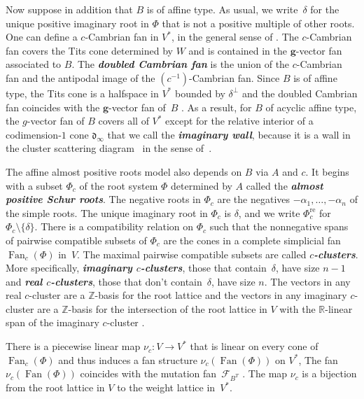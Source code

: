 \documentclass{amsart}
\theoremstyle{definition}
\theoremstyle{remark}
\numberwithin{equation}{section}
\newcommand{\newword}[1]{\textbf{\emph{#1}}}
\newcommand{\integers}{\mathbb Z}
\newcommand{\reals}{\mathbb R}
\newcommand{\set}[1]{{\lbrace #1 \rbrace}}
\newcommand{\F}{{\mathcal F}}
\newcommand{\0}{{\mathbf{0}}}
\newcommand{\g}{\mathbf{g}}
\newcommand{\Fan}{\operatorname{Fan}}
\newcommand{\re}{\mathrm{re}}
\renewcommand{\d}{{\mathfrak d}}
\newcommand{\RSChar}{\Phi}
\newcommand{\RS}{\RSChar}
\newcommand{\AP}[1]{\RS_{#1}}
\newcommand{\APre}[1]{\AP{#1}^\re}
\begin{document}
Now suppose in addition that $B$ is of affine type.
As usual, we write~$\delta$ for the unique positive imaginary root in $\RS$ that is not a positive multiple of other roots.
One can define a $c$-Cambrian fan in $V^*$, in the general sense of \cite[Section~9]{typefree}.
The $c$-Cambrian fan covers the Tits cone determined by $W$ and is contained in the $\g$-vector fan associated to $B$.
The \newword{doubled Cambrian fan} is the union of the $c$-Cambrian fan and the antipodal image of the $(c^{-1})$-Cambrian fan.
Since $B$ is of affine type, the Tits cone is a halfspace in $V^*$ bounded by $\delta^\perp$ and the doubled Cambrian fan coincides with the $\g$-vector fan of~$B$ \cite[Corollary~1.3]{afframe}.
As a result, for $B$ of acyclic affine type, the $g$-vector fan of $B$ covers all of $V^*$ except for the relative interior of a codimension-$1$ cone $\d_\infty$ that we call the \newword{imaginary wall}, because it is a wall in the cluster scattering diagram~\cite{affscat} in the sense of~\cite{GHKK}.

The affine almost positive roots model also depends on $B$ via $A$ and $c$.
It begins with a subset $\AP{c}$ of the root system $\RS$ determined by $A$ called the \newword{almost positive Schur roots}.
The negative roots in $\AP{c}$ are the negatives $-\alpha_1,\ldots,-\alpha_n$ of the simple roots.
The unique imaginary root in $\AP{c}$ is $\delta$, and we write $\APre{c}$ for $\AP{c}\setminus\set\delta$.
There is a compatibility relation on $\AP{c}$ such that the nonnegative spans of pairwise compatible subsets of $\AP{c}$ are the cones in a complete simplicial fan $\Fan_c(\RS)$ in~$V$.
The maximal pairwise compatible subsets are called \newword{$c$-clusters}.
More specifically, \newword{imaginary $c$-clusters}, those that contain~$\delta$, have size $n-1$ and \newword{real $c$-clusters}, those that don't contain~$\delta$, have size $n$.
The vectors in any real $c$-cluster are a $\integers$-basis for the root lattice \cite[Proposition~5.14(2)]{affdenom} and the vectors in any imaginary $c$-cluster are a $\integers$-basis for the intersection of the root lattice in $V$ with the $\reals$-linear span of the imaginary $c$-cluster \cite[Proposition~5.14(6)]{affdenom}.

There is a piecewise linear map $\nu_c:V\to V^*$ that is linear on every cone of $\Fan_c(\RS)$ and thus induces a fan structure $\nu_c(\Fan(\RS))$ on $V^*$,
The fan $\nu_c(\Fan(\RS))$ coincides with the mutation fan~$\F_{B^T}$ \cite[Theorem~2.9]{affscat}.
The map $\nu_c$ is a bijection from the root lattice in $V$ to the weight lattice in~$V^*$.
\end{document}
